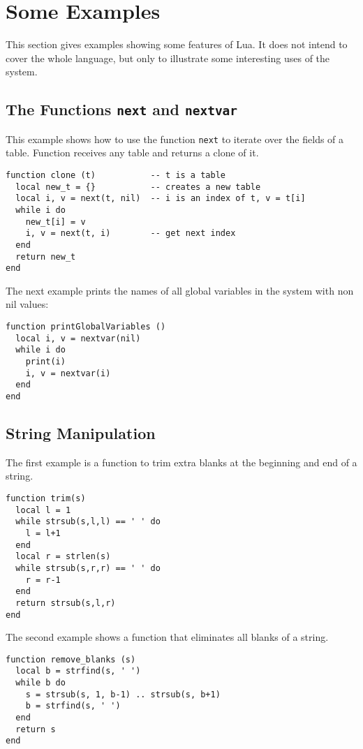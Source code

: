\section{Some Examples}

This section gives examples showing some features of Lua.
It does not intend to cover the whole language,
but only to illustrate some interesting uses of the system.


\subsection{The Functions {\tt next} and {\tt nextvar}} \label{exnext}
This example shows how to use the function \verb'next' to iterate
over the fields of a table.
Function  receives any table and returns a clone of it.
\begin{verbatim}
function clone (t)           -- t is a table
  local new_t = {}           -- creates a new table
  local i, v = next(t, nil)  -- i is an index of t, v = t[i]
  while i do
    new_t[i] = v
    i, v = next(t, i)        -- get next index
  end
  return new_t
end
\end{verbatim}

The next example prints the names of all global variables
in the system with non nil values:
\begin{verbatim}
function printGlobalVariables ()
  local i, v = nextvar(nil)
  while i do
    print(i)
    i, v = nextvar(i)
  end
end
\end{verbatim}


\subsection{String Manipulation} \label{exstring}

The first example is a function to trim extra blanks at the beginning
and end of a string.
\begin{verbatim}
function trim(s)
  local l = 1
  while strsub(s,l,l) == ' ' do
    l = l+1
  end
  local r = strlen(s)
  while strsub(s,r,r) == ' ' do
    r = r-1
  end
  return strsub(s,l,r)
end
\end{verbatim}

The second example shows a function that eliminates all blanks
of a string.
\begin{verbatim}
function remove_blanks (s)
  local b = strfind(s, ' ')
  while b do
    s = strsub(s, 1, b-1) .. strsub(s, b+1)
    b = strfind(s, ' ')
  end
  return s
end
\end{verbatim}


